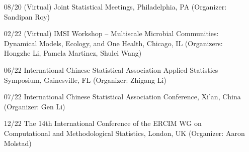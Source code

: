 \documentclass[10pt]{article}
\begin{document}
\begin{enumerate}
\item[08/20] (Virtual) Joint Statistical Meetings, Philadelphia, PA (Organizer: Sandipan Roy)
\item[02/22] (Virtual)  IMSI Workshop -- Multiscale Microbial Communities: Dynamical Models, Ecology, and One Health,
Chicago, IL (Organizers: Hongzhe Li, Pamela Martinez, Shulei Wang)
\item[06/22] International Chinese Statistical Association Applied Statistics Symposium, Gainesville, FL (Organizer: Zhigang Li)
\item[07/22] International Chinese Statistical Association Conference, Xi'an, China (Organizer: Gen Li)
\item[12/22] The 14th International Conference of the ERCIM WG on Computational and Methodological Statistics, London, UK (Organizer: Aaron Molstad)

\end{enumerate}
\end{document}
